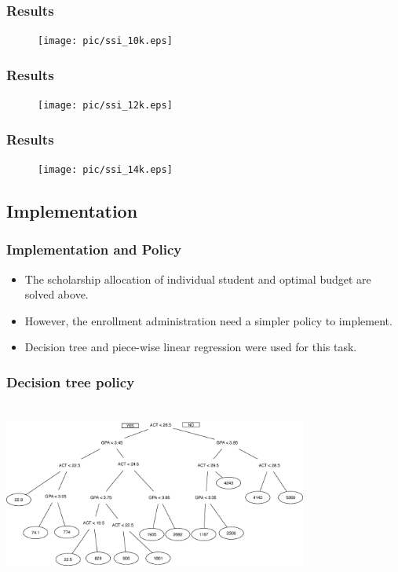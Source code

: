 \documentclass{beamer}
\begin{document}
\frametitle{Results}
\begin{frame}
\begin{figure}
    \centering
  \texttt{[image: pic/ssi\_10k.eps]}
\end{figure}
\end{frame}


\begin{frame}
\frametitle{Results}
\begin{figure}
    \centering
  \texttt{[image: pic/ssi\_12k.eps]}
\end{figure}
\end{frame}


\begin{frame}
\frametitle{Results}
\begin{figure}
    \centering
  \texttt{[image: pic/ssi\_14k.eps]}
\end{figure}
\end{frame}

\subsection{Implementation}

\begin{frame}
\frametitle{Implementation and Policy}
\begin{itemize}
\item The scholarship allocation of individual 
student and optimal budget are solved above.
\item However, the enrollment administration need a 
simpler policy to implement.
\item  Decision tree and piece-wise linear regression were used for this task.
\end{itemize}
 
\end{frame}

\begin{frame}
\frametitle{Decision tree policy}
\includegraphics[width=10cm, height=6cm, scale = 0.4]
{pic/FA_DT_Result.eps}
\end{frame}
\end{document}
